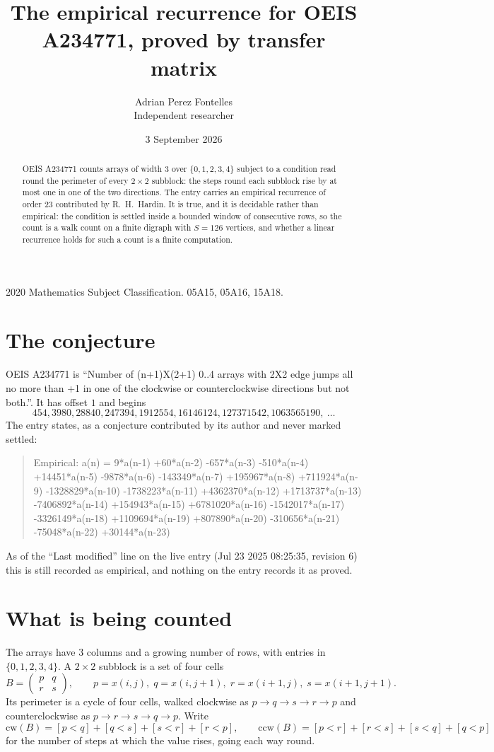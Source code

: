 \documentclass[11pt,a4paper]{article}
\title{The empirical recurrence for OEIS A234771, proved by transfer matrix}
\author{Adrian Perez Fontelles\\ \small Independent researcher}
\date{3 September 2026}
\theoremstyle{plain}
\theoremstyle{definition}
\begin{document}
\maketitle

\begin{abstract}
OEIS A234771 counts arrays of width $3$ over $\{0,1,2,3,4\}$ subject to a condition read round the
perimeter of every $2\times2$ subblock: the steps round each subblock rise by at most one in one of the two directions. The entry carries an empirical recurrence of
order $23$ contributed by R.~H.~Hardin. It is true, and it is decidable rather than
empirical: the condition is settled inside a bounded window of consecutive rows, so the
count is a walk count on a finite digraph with $S=126$ vertices, and whether a linear
recurrence holds for such a count is a finite computation.
\end{abstract}

\noindent\small 2020 Mathematics Subject Classification. 05A15, 05A16, 15A18.\normalsize

\section{The conjecture}

OEIS A234771 is ``Number of (n+1)X(2+1) 0..4 arrays with 2X2 edge jumps all no more than +1 in one of the clockwise or counterclockwise directions but not both.''. It has offset $1$ and begins
\[
454, 3980, 28840, 247394, 1912554, 16146124, 127371542, 1063565190,\ \dots
\]
The entry states, as a conjecture contributed by its author and never marked settled:
\begin{quote}
Empirical: a(n) = 9*a(n-1) +60*a(n-2) -657*a(n-3) -510*a(n-4) +14451*a(n-5) -9878*a(n-6) -143349*a(n-7) +195967*a(n-8) +711924*a(n-9) -1328829*a(n-10) -1738223*a(n-11) +4362370*a(n-12) +1713737*a(n-13) -7406892*a(n-14) +154943*a(n-15) +6781020*a(n-16) -1542017*a(n-17) -3326149*a(n-18) +1109694*a(n-19) +807890*a(n-20) -310656*a(n-21) -75048*a(n-22) +30144*a(n-23)
\end{quote}
As of the ``Last modified'' line on the live entry (Jul 23 2025 08:25:35, revision 6) this is still
recorded as empirical, and nothing on the entry records it as proved.

\section{What is being counted}

The arrays have $3$ columns and a growing number of rows, with entries in $\{0,1,2,3,4\}$. A
$2\times2$ subblock is a set of four cells
\[
B=\begin{pmatrix} p & q \\ r & s \end{pmatrix},
\qquad p=x(i,j),\; q=x(i,j+1),\; r=x(i+1,j),\; s=x(i+1,j+1).
\]
Its perimeter is a cycle of four cells, walked clockwise as $p\to q\to s\to r\to p$ and
counterclockwise as $p\to r\to s\to q\to p$. Write
\[
\mathrm{cw}(B)=[p<q]+[q<s]+[s<r]+[r<p],\qquad
\mathrm{ccw}(B)=[p<r]+[r<s]+[s<q]+[q<p]
\]
for the number of steps at which the value rises, going each way round.
\end{document}

